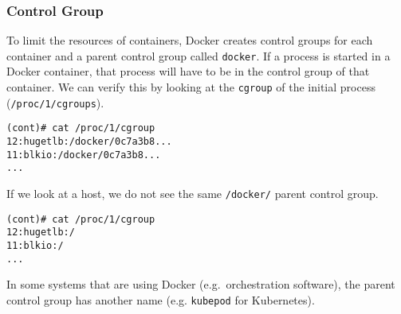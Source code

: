 \subsubsection{Control Group}\label{subsubsection:detection:cgroup}
To limit the resources of containers, Docker creates control groups for each container and a parent control group called \lstinline{docker}. If a process is started in a Docker container, that process will have to be in the control group of that container. We can verify this by looking at the \lstinline{cgroup} of the initial process (\lstinline{/proc/1/cgroups})\cite{Metasploit-Linux-Gather-Container-Detection}.

\begin{lstlisting}[caption={Process control group inside container\protect\footnotemark.},captionpos=b]
(cont)# cat /proc/1/cgroup
12:hugetlb:/docker/0c7a3b8...
11:blkio:/docker/0c7a3b8...
...
\end{lstlisting}

If we look at a host, we do not see the same \lstinline{/docker/} parent control group.
\begin{lstlisting}[caption={Process control groups on the host.},captionpos=b]
(cont)# cat /proc/1/cgroup
12:hugetlb:/
11:blkio:/
...
\end{lstlisting}

In some systems that are using Docker (e.g.\ orchestration software), the parent control group has another name (e.g. \lstinline{kubepod} for Kubernetes).
